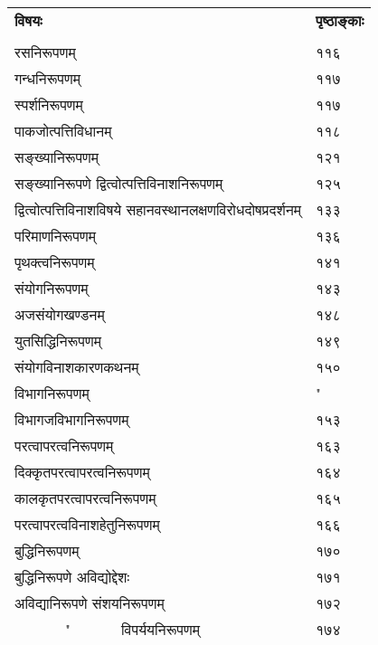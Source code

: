 \documentclass[11pt, openany]{book}
\begin{document}
\newpage
\noindent
\begin{tabular}{m{28em} m{2em}}
\textbf{विषयः} & \textbf{पृष्ठाङ्काः}\\
 &\\ 
 रसनिरूपणम् & ११६\\
गन्धनिरूपणम् & ११७\\
स्पर्शनिरूपणम् & ११७\\
पाकजोत्पत्तिविधानम् & ११८\\
सङ्ख्यानिरूपणम् & १२१\\
सङ्ख्यानिरूपणे द्वित्वोत्पत्तिविनाशनिरूपणम् & १२५\\
द्वित्वोत्पत्तिविनाशविषये सहानवस्थानलक्षणविरोधदोषप्रदर्शनम् & १३३\\
परिमाणनिरूपणम् & १३६\\
पृथक्त्वनिरूपणम् & १४१\\
संयोगनिरूपणम् & १४३\\
अजसंयोगखण्डनम् & १४८\\
युतसिद्धिनिरूपणम् & १४९\\
संयोगविनाशकारणकथनम् & १५०\\
विभागनिरूपणम् & "\\
विभागजविभागनिरूपणम् & १५३\\
परत्वापरत्वनिरूपणम् & १६३\\
दिक्कृतपरत्वापरत्वनिरूपणम् & १६४\\
कालकृतपरत्वापरत्वनिरूपणम् & १६५\\
परत्वापरत्वविनाशहेतुनिरूपणम् & १६६\\
बुद्धिनिरूपणम् & १७०\\
बुद्धिनिरूपणे अविद्योद्देशः & १७१\\
अविद्यानिरूपणे संशयनिरूपणम् & १७२\\
~~~~~~~"~~~~~~~विपर्ययनिरूपणम् & १७४\\
प्रत्यक्षविषयविपर्ययनिरूपणम् & "\\
अनुमानविषयविपर्ययनिरूपणम् & १७६\\
अनध्यवसायनिरूपणम् & १७८\\
प्रत्यक्षविषयानध्यवसायनिरूपणम् & "\\
अनुमानविषयानध्यवसायनिरूपणम् & १७९\\
स्वप्ननिरूपणम् & "\\
स्वप्नान्तिकनिरूपणम् & १८२\\
विद्योद्देशः & १८३\\
प्रत्यक्षनिरूपणम् & "\\
द्रव्यप्रत्यक्षहेतुनिरूपणम् & १८४\\
रूपरसगन्धस्पर्शग्राहकप्रत्यक्षनिरूपणम् & १८६
\end{tabular}
\end{document}
